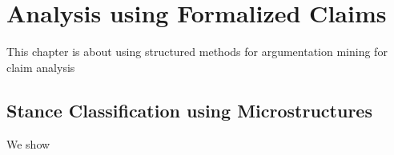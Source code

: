 \chapter{Analysis using Formalized Claims}
\label{chap:analysis}

This chapter is about using structured methods for argumentation mining
for claim analysis \\


\section{Stance Classification using Microstructures}

We show
